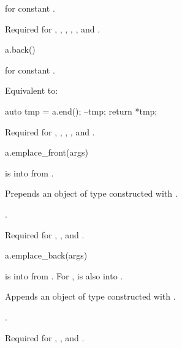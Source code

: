 \begin{itemdescr}
\pnum
\result
{} for constant .

\pnum
\returns
{}

\pnum
\remarks
Required for
,
,
,
,
, and
.
\end{itemdescr}

\begin{itemdecl}
a.back()
\end{itemdecl}

\begin{itemdescr}
\pnum
\result
{} for constant .

\pnum
\effects
Equivalent to:
\begin{codeblock}
auto tmp = a.end();
--tmp;
return *tmp;
\end{codeblock}

\pnum
\remarks
Required for
,
,
,
, and
.
\end{itemdescr}

\begin{itemdecl}
a.emplace_front(args)
\end{itemdecl}

\begin{itemdescr}
\pnum
\result
{}

\pnum
\expects
{} is  into  from .

\pnum
\effects
Prepends an object of type 
constructed with .

\pnum
\returns
{}.

\pnum
\remarks
Required for
,
, and
.
\end{itemdescr}

\begin{itemdecl}
a.emplace_back(args)
\end{itemdecl}

\begin{itemdescr}
\pnum
\result
{}

\pnum
\expects
{} is  into  from .
For ,
 is also  into .

\pnum
\effects
Appends an object of type 
constructed with .

\pnum
\returns
{}.

\pnum
\remarks
Required for
,
, and
.
\end{itemdescr}

